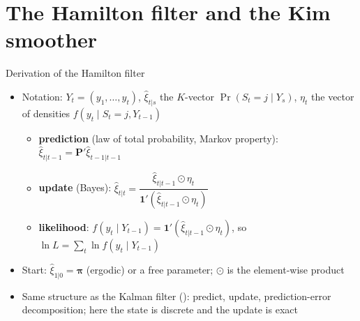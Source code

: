 \section{The Hamilton filter and the Kim smoother}

\begin{frame}{Derivation of the Hamilton filter}
\itemsize{\small}
\begin{itemize}
    \item Notation: $Y_t = (y_1, \dots, y_t)$, $\hat\xi_{t|s}$ the $K$-vector $\Pr(S_t = j \mid Y_s)$, $\eta_t$ the vector of densities $f(y_t \mid S_t = j, Y_{t-1})$
    \begin{itemize}
        \item \textbf{prediction} (law of total probability, Markov property): $\hat\xi_{t|t-1} = \mathbf{P}'\hat\xi_{t-1|t-1}$
        \item \textbf{update} (Bayes): $\hat\xi_{t|t} = \dfrac{\hat\xi_{t|t-1}\odot\eta_t}{\mathbf{1}'(\hat\xi_{t|t-1}\odot\eta_t)}$
        \item \textbf{likelihood}: $f(y_t \mid Y_{t-1}) = \mathbf{1}'(\hat\xi_{t|t-1}\odot\eta_t)$, so $\ln L = \sum_t \ln f(y_t \mid Y_{t-1})$
    \end{itemize}
    \item Start: $\hat\xi_{1|0} = \boldsymbol\pi$ (ergodic) or a free parameter; $\odot$ is the element-wise product
    \item Same structure as the Kalman filter (): predict, update, prediction-error decomposition; here the state is discrete and the update is exact
\end{itemize}
\end{frame}

